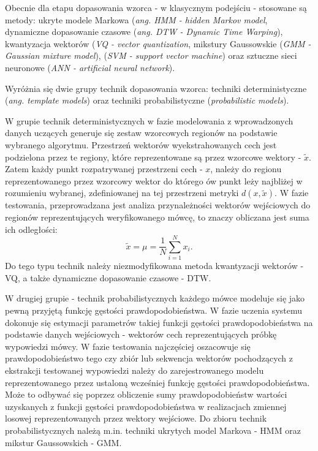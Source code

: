 Obecnie dla etapu dopasowania wzorca - w klasycznym podejściu - stosowane są metody\cite{campbell}\cite{overview}: ukryte modele Markowa (\textit{ang. HMM - hidden Markov model}, dynamiczne dopasowanie czasowe (\textit{ang. DTW - Dynamic Time Warping}), kwantyzacja wektorów (\textit{VQ - vector quantization}, mikstury Gaussowskie (\textit{GMM - Gaussian mixture model}), (\textit{SVM - support vector machine}) oraz sztuczne sieci neuronowe (\textit{ANN - artificial neural network}).

Wyróżnia się dwie grupy technik dopasowania wzorca: techniki deterministyczne (\textit{ang. template models}) oraz techniki probabilistyczne (\textit{probabilistic models})\cite{campbell}.

W grupie technik deterministycznych w fazie modelowania z wprowadzonych danych uczących generuje się zestaw wzorcowych regionów na podstawie wybranego algorytmu. Przestrzeń wektorów wyekstrahowanych cech jest podzielona przez te regiony, które reprezentowane są przez wzorcowe wektory - $ \tilde{x}$. Zatem każdy punkt rozpatrywanej przestrzeni cech - $x$, należy do regionu reprezentowanego przez wzorcowy wektor do którego ów punkt leży najbliżej w rozumieniu wybranej, zdefiniowanej na tej przestrzeni metryki $ d(x,\tilde{x})$. W fazie testowania, przeprowadzana jest analiza przynależności wektorów wejściowych do regionów reprezentujących weryfikowanego mówcę, to znaczy obliczana jest suma ich odległości:
\begin{equation}
  \tilde{x} = \mu = \frac{1}{N}\sum_{i=1}^{N}x_i.
\end{equation}
Do tego typu technik należy niezmodyfikowana metoda kwantyzacji wektorów - VQ, a także dynamiczne dopasowanie czasowe - DTW.

W drugiej grupie - technik probabilistycznych każdego mówce modeluje się jako pewną przyjętą funkcję gęstości prawdopodobieństwa. W fazie uczenia systemu dokonuje się estymacji parametrów takiej funkcji gęstości prawdopodobieństwa na podstawie danych wejściowych - wektorów cech reprezentujących próbkę wypowiedzi mówcy. W fazie testowania najczęściej oszacowuje się prawdopodobieństwo tego czy zbiór lub sekwencja wektorów pochodzących z ekstrakcji testowanej wypowiedzi należy do zarejestrowanego modelu reprezentowanego przez ustaloną wcześniej funkcję gęstości prawdopodobieństwa. Może to odbywać się poprzez obliczenie sumy prawdopodobieństw wartości uzyskanych z funkcji gęstości prawdopodobieństwa w realizacjach zmiennej losowej reprezentowanych przez wektory wejściowe. %
Do zbioru technik probabilistycznych należą m.in. techniki ukrytych model Markova - HMM oraz mikstur Gaussowskich - GMM.

